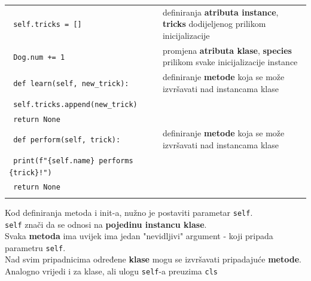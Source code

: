 \documentclass[10pt]{article}
\begin{document}
\begin{tabular}{|>{\tt}p{10.00cm}|>{}p{14.50cm}|}
        \hspace{5mm} \hspace{5mm} self.tricks = [] & definiranja \textbf{atributa instance}, \textbf{tricks} dodijeljenog prilikom inicijalizacije
        \\
        \hspace{5mm} \hspace{5mm} Dog.num += 1 & promjena \textbf{atributa klase}, \textbf{species} prilikom svake inicijalizacije instance
        \\
        \hspace{5mm} def learn(self, new\_trick): & definiranje \textbf{metode} koja se može izvršavati nad instancama klase
        \\
        \hspace{5mm} \hspace{5mm} self.tricks.append(new\_trick) &
        \\
        \hspace{5mm} \hspace{5mm} return None &
        \\
        \hspace{5mm} def perform(self, trick): & definiranje \textbf{metode} koja se može izvršavati nad instancama klase
        \\
        \hspace{5mm} \hspace{5mm} print(f"\{self.name\} performs \{trick\}!") &
        \\
        \hspace{5mm} \hspace{5mm} return None &
        \\ & \\ \hline
    \end{tabular}
    \begin{center}
        Kod definiranja metoda i init-a, nužno je postaviti parametar \texttt{self}.
        \\
        \texttt{self} znači da se odnosi na \textbf{pojedinu instancu klase}.
        \\
        Svaka \textbf{metoda} ima uvijek ima jedan "nevidljivi" argument - koji pripada parametru \texttt{self}.
        \\
        Nad svim pripadnicima određene \textbf{klase} mogu se izvršavati pripadajuće \textbf{metode}.
        \\
        Analogno vrijedi i za klase, ali ulogu \texttt{self}-a preuzima \texttt{cls}
    \end{center}
\end{document}
